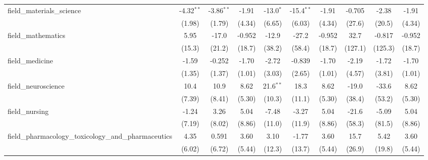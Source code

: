 \begin{tabular}{lccccccccc}
   field\_materials\_science                                   & -4.32$^{**}$ & -3.86$^{**}$  & -1.91         & -13.0$^{*}$ & -15.4$^{**}$ & -1.91         & -0.705    & -2.38   & -1.91\\   
                                                               & (1.98)       & (1.79)        & (4.34)        & (6.65)      & (6.03)       & (4.34)        & (27.6)    & (20.5)  & (4.34)\\   
   field\_mathematics                                          & 5.95         & -17.0         & -0.952        & -12.9       & -27.2        & -0.952        & 32.7      & -0.817  & -0.952\\   
                                                               & (15.3)       & (21.2)        & (18.7)        & (38.2)      & (58.4)       & (18.7)        & (127.1)   & (125.3) & (18.7)\\   
   field\_medicine                                             & -1.59        & -0.252        & -1.70         & -2.72       & -0.839       & -1.70         & -2.19     & -1.72   & -1.70\\   
                                                               & (1.35)       & (1.37)        & (1.01)        & (3.03)      & (2.65)       & (1.01)        & (4.57)    & (3.81)  & (1.01)\\   
   field\_neuroscience                                         & 10.4         & 10.9          & 8.62          & 21.6$^{**}$ & 18.3         & 8.62          & -19.0     & -33.6   & 8.62\\   
                                                               & (7.39)       & (8.41)        & (5.30)        & (10.3)      & (11.1)       & (5.30)        & (38.4)    & (53.2)  & (5.30)\\   
   field\_nursing                                              & -1.24        & 3.26          & 5.04          & -7.48       & -3.27        & 5.04          & -21.6     & -5.09   & 5.04\\   
                                                               & (7.19)       & (8.02)        & (8.86)        & (11.0)      & (11.9)       & (8.86)        & (58.3)    & (81.5)  & (8.86)\\   
   field\_pharmacology\_toxicology\_and\_pharmaceutics         & 4.35         & 0.591         & 3.60          & 3.10        & -1.77        & 3.60          & 15.7      & 5.42    & 3.60\\   
                                                               & (6.02)       & (6.72)        & (5.44)        & (12.3)      & (13.7)       & (5.44)        & (26.9)    & (19.8)  & (5.44)\\   

\end{tabular}
